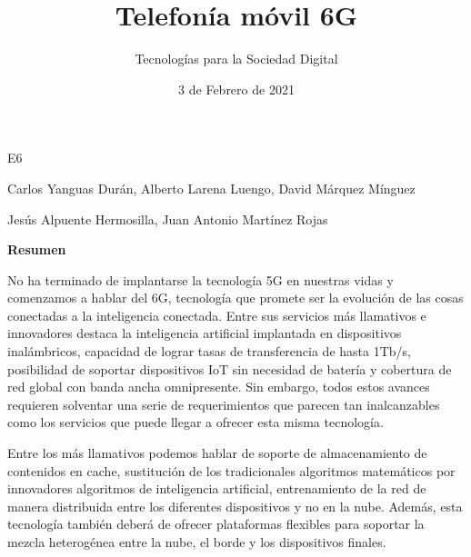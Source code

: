  

 

\graphicspath{{../Book/figures/}}


\title{Telefonía móvil 6G}
\date{3 de Febrero de 2021}            
\author{Tecnologías para la Sociedad Digital}




\maketitle
\begin{description}                             
  {        
  \item[Título en inglés:] \mybooktitleenglish   
  }                                            
  {                                           
  }                                              
\item[Equipo:] E6   
\item[Autores:] Carlos Yanguas Durán, Alberto Larena Luengo, David Márquez Mínguez                
\item[\expandafter\makefirstuc\expandafter{\mybookTutorOrTutores}:] Jesús Alpuente Hermosilla, Juan Antonio Martínez Rojas          
\end{description}   

\begin{center}
 {\bfseries \Large Resumen}
\end{center}
No ha terminado de implantarse la tecnología 5G en nuestras  vidas y comenzamos a hablar del 6G, tecnología que promete ser la evolución de las cosas conectadas a la inteligencia conectada. Entre sus servicios más llamativos e innovadores destaca la inteligencia artificial implantada en dispositivos inalámbricos, capacidad de lograr tasas de transferencia de hasta 1Tb/s, posibilidad de soportar dispositivos IoT sin necesidad de batería y cobertura de red global con banda ancha omnipresente. Sin embargo, todos estos avances requieren solventar una serie de requerimientos que parecen tan inalcanzables como los servicios que puede llegar a ofrecer esta misma tecnología. 

Entre los más llamativos podemos hablar de soporte de almacenamiento de contenidos en cache, sustitución de los tradicionales algoritmos matemáticos por innovadores algoritmos de inteligencia artificial, entrenamiento de la red de manera distribuida entre los diferentes dispositivos y no en la nube. Además, esta tecnología también deberá de ofrecer plataformas flexibles para soportar la mezcla heterogénea entre la nube, el borde y los dispositivos finales.


